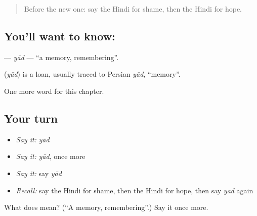\label{lesson:HI-C186-yad}



\begin{quote}
Before the new one: say the Hindi for shame, then the Hindi for hope.
\end{quote}

\subsection*{You'll want to know: }
\textbf{} — \emph{yād} — \textquotedblleft{}a memory, remembering\textquotedblright{}.

\begin{cousinweb}
\textbf{} (\emph{yād}) is a loan, usually traced to Persian \emph{yād}, \textquotedblleft{}memory\textquotedblright{}.
\end{cousinweb}

\begin{grammarlens}[title={What you've built}]
One more word for this chapter.
\end{grammarlens}

\subsection*{Your turn}
\begin{itemize}
\raggedright
  \item \emph{Say it:} \emph{yād}
  \item \emph{Say it:} \emph{yād}, once more
  \item \emph{Say it:} say \emph{yād}
  \item \emph{Recall:} say the Hindi for shame, then the Hindi for hope, then say \emph{yād} again
\end{itemize}

\begin{tcolorbox}[breakable,colback=teal!4,colframe=teal!35!black,title={Before you move on}]
What does  mean? (\textquotedblleft{}A memory, remembering\textquotedblright{}.) Say it once more.
\end{tcolorbox}
